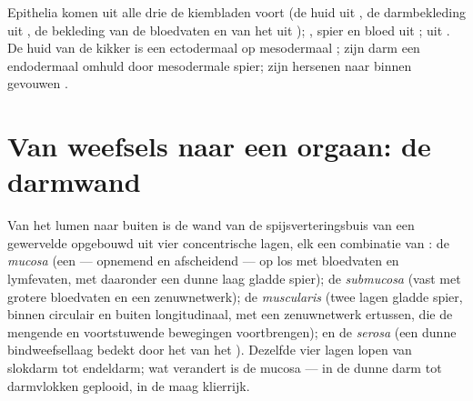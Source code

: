 \begin{example}\label{ex:b1:body-plans-tissues:origin}
Epithelia komen uit alle drie de kiembladen voort (de huid uit , de
darmbekleding uit , de bekleding van de bloedvaten en van het  uit
); , spier en bloed uit ;  uit .
De huid van de kikker is een ectodermaal  op mesodermaal ;
zijn darm een endodermaal  omhuld door mesodermale spier; zijn hersenen
naar binnen gevouwen .
\end{example}

\section{Van weefsels naar een orgaan: de darmwand}

\begin{proposition}\label{prop:b1:body-plans-tissues:gutwall}
Van het lumen naar buiten is de wand van de spijsverteringsbuis van een
gewervelde opgebouwd uit vier concentrische lagen, elk een combinatie van
: de \emph{mucosa} (een  --- opnemend en afscheidend --- op los
 met bloedvaten en lymfevaten, met daaronder een dunne laag gladde spier);
de \emph{submucosa} (vast  met grotere bloedvaten en een zenuwnetwerk); de
\emph{muscularis} (twee lagen gladde spier, binnen circulair en buiten
longitudinaal, met een zenuwnetwerk ertussen, die de mengende en voortstuwende
bewegingen voortbrengen); en de \emph{serosa} (een dunne bindweefsellaag bedekt
door het  van het ). Dezelfde vier lagen lopen van slokdarm tot
endeldarm; wat verandert is de mucosa --- in de dunne darm tot darmvlokken
geplooid, in de maag klierrijk.
\end{proposition}

